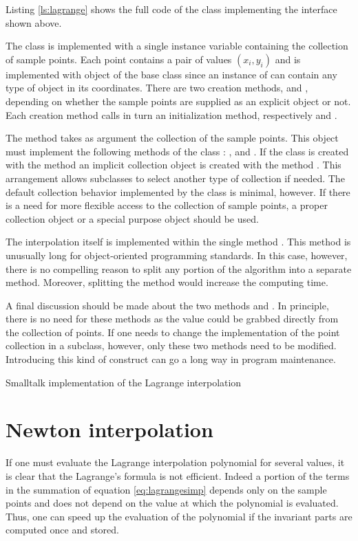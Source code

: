 Listing \ref{ls:lagrange} shows the full code of the class
implementing the interface shown above.

The class  is implemented with a
single instance variable containing the collection of sample
points. Each point contains a pair of values
$\left(x_i,y_i\right)$ and is implemented with object of the base
class  since an instance of  can contain any
type of object in its coordinates. There are two creation methods,
 and , depending on whether the sample
points are supplied as an explicit object or not. Each creation
method calls in turn an initialization method, respectively  and \code{\initialize}.

The method  takes as argument the collection of the
sample points. This object must implement the following methods of
the class : ,  and .
If the class is created with the method  an implicit
collection object is created with the method . This arrangement allows subclasses to select
another type of collection if needed. The default collection
behavior implemented by the class  is
minimal, however. If there is a need for more flexible access to
the collection of sample points, a proper collection object or a
special purpose object should be used.

The interpolation itself is implemented within the single method
. This method is unusually long for object-oriented
programming standards. In this case, however, there is no
compelling reason to split any portion of the algorithm into a
separate method. Moreover, splitting the method would increase the
computing time.

A final discussion should be made about the two methods  and . In principle, there is no need for
these methods as the value could be grabbed directly from the
collection of points. If one needs to change the implementation of
the point collection in a subclass, however, only these two
methods need to be modified. Introducing this kind of construct
can go a long way in program maintenance.
\begin{listing}
Smalltalk implementation of the Lagrange interpolation
\label{ls:lagrange}

\end{listing}

\section{Newton interpolation}
\label{sec:newtoninterpol} If one must evaluate the Lagrange
interpolation polynomial for several values, it is clear that the
Lagrange's formula is not efficient. Indeed a portion of the terms
in the summation of equation \ref{eq:lagrangesimp} depends only on
the sample points and does not depend on the value at which the
polynomial is evaluated. Thus, one can speed up the evaluation of
the polynomial if the invariant parts are computed once and
stored.

